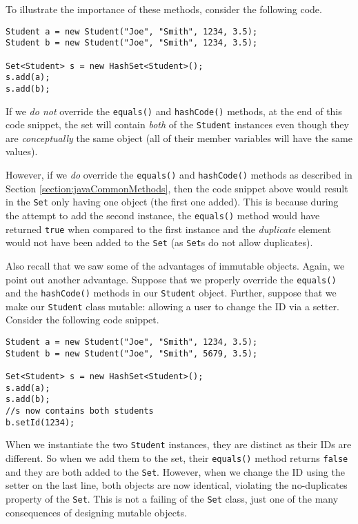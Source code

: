 To illustrate the importance of these methods, consider the following 
code.

\begin{verbatim}
Student a = new Student("Joe", "Smith", 1234, 3.5);		
Student b = new Student("Joe", "Smith", 1234, 3.5);
		
Set<Student> s = new HashSet<Student>();
s.add(a);
s.add(b);
\end{verbatim}

If we \emph{do not} override the \texttt{equals()} and
\texttt{hashCode()} methods, at the end of this code 
snippet, the set will contain \emph{both} of the \texttt{Student}
instances even though they are \emph{conceptually} the same object
(all of their member variables will have the same values).  

However, if we \emph{do} override the \texttt{equals()} and
\texttt{hashCode()} methods as described in Section 
\ref{section:javaCommonMethods}, then the code snippet above would
result in the \texttt{Set} only having one object (the
first one added).  This is because during the attempt to add the second
instance, the \texttt{equals()} method would have returned
\texttt{true} when compared to the first instance and the
\emph{duplicate} element would not have been added to the \texttt{Set}
(as \texttt{Set}s do not allow duplicates).

Also recall that we saw some of the advantages of immutable objects. 
Again, we point out another advantage.  Suppose that we properly 
override the \texttt{equals()} and the \texttt{hashCode()} 
methods in our \texttt{Student} object.  Further, suppose
that we make our \texttt{Student} class mutable: allowing
a user to change the ID via a setter.  Consider the following code snippet.

\begin{verbatim}
Student a = new Student("Joe", "Smith", 1234, 3.5);		
Student b = new Student("Joe", "Smith", 5679, 3.5);
		
Set<Student> s = new HashSet<Student>();
s.add(a);
s.add(b);
//s now contains both students
b.setId(1234);
\end{verbatim}

When we instantiate the two \texttt{Student} instances, they
are distinct as their IDs are different.  So when we add them to the set, 
their \texttt{equals()} method returns \texttt{false}
and they are both added to the \texttt{Set}.  However, when 
we change the ID using the setter on the last line, both objects are now
identical, violating the no-duplicates property of the \texttt{Set}.
This is not a failing of the \texttt{Set} class, just one of
the many consequences of designing mutable objects.  


